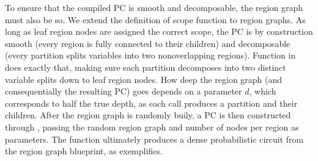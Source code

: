 To ensure that the compiled PC is smooth and decomposable, the region graph must also be so. We
extend the definition of scope function to region graphs. As long as leaf region nodes are assigned
the correct scope, the PC is by construction smooth (every region is fully connected to their
children) and decomposable (every partition splits variables into two nonoverlapping regions).
Function  in  does exactly that, making sure each partition
decomposes into two distinct variable splits down to leaf region nodes. How deep the region graph
(and consequentially the resulting PC) goes depends on a parameter $d$, which corresponds to half
the true depth, as each  call produces a partition and their children. After
the region graph is randomly buily, a PC is then constructed through ,
passing the random region graph and number of nodes per region as parameters. The function
ultimately produces a dense probabilistic circuit from the region graph blueprint, as
 exemplifies.

